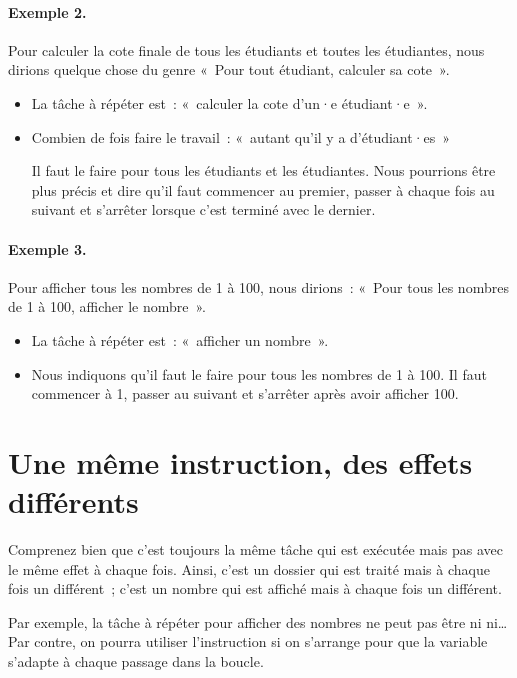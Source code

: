 	\paragraph{Exemple 2.}
	Pour calculer la cote finale de tous les étudiants et toutes les étudiantes,
	nous dirions quelque chose du genre 
	«~Pour tout étudiant, calculer sa cote~».
	\begin{itemize}
	\item 
		La tâche à répéter est~: «~calculer la cote d’un·e étudiant·e~».
	\item
		Combien de fois faire le travail~: «~autant qu'il y a d'étudiant·es~»

		Il faut le faire pour tous les étudiants et les étudiantes. Nous
		pourrions être plus précis et dire qu'il faut commencer au premier,
		passer à chaque fois au suivant et s'arrêter lorsque c'est terminé avec
		le dernier. 
	
\end{itemize}

	\paragraph{Exemple 3.}
	Pour afficher tous les nombres de 1 à 100, nous dirions~:
	«~Pour tous les nombres de 1 à 100, afficher le nombre~».
	\begin{itemize}
	\item
		La tâche à répéter est~: «~afficher un nombre~».
	\item 
		Nous indiquons qu'il faut le faire pour tous les nombres de 1 à 100. Il
		faut commencer à 1, passer au suivant et s'arrêter après avoir afficher
		100.
\end{itemize}
		
\section{Une même instruction, des effets différents}

	Comprenez bien que c’est toujours la même tâche qui est exécutée mais pas
	avec le même effet à chaque fois.  Ainsi, c'est un dossier qui est traité
	mais à chaque fois un différent~; c'est un nombre qui est affiché mais
	à chaque fois un différent. 
	
	Par exemple, la tâche à répéter pour afficher des nombres ne peut pas être
	 ni  ni\dots{} Par contre, on pourra
	utiliser l’instruction  si on s’arrange pour que la
	variable  s’adapte à chaque passage dans la boucle.


